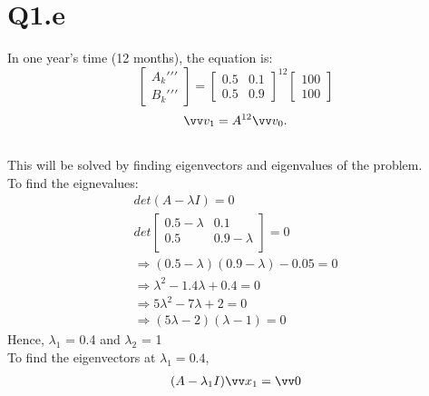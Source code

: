 \documentclass[10pt,a4paper]{article}
\numberwithin{equation}{section}
\begin{document}
		\section*{Q1.e}
		In one year's time (12 months), the equation is:
		\[\begin{bmatrix}
		A_{k}{\prime\prime\prime}\\
		B_{k}{\prime\prime\prime} 
		\end{bmatrix}
		=\begin{bmatrix}
		0.5 & 0.1 \\
		0.5 & 0.9
		\end{bmatrix}^{12}
		\begin{bmatrix}
		100 \\
		100
		\end{bmatrix}
		\]
		\[\begin{aligned}
		\vv v_{1} = A^{12} \vv v_{0}.
		\end{aligned}\]
		\\
		This will be solved by finding eigenvectors and eigenvalues of the problem.\\
		
		\noindent To find the eignevalues:
		\begin{align*}
		det(A - \lambda I) = 0 \\
		det\begin{bmatrix}
		0.5 - \lambda & 0.1\\
		0.5 & 0.9 -\lambda\\		
		\end{bmatrix}=0\\
		\Rightarrow(0.5 -\lambda)(0.9 - \lambda) - 0.05 = 0\\
		\Rightarrow\lambda^2 - 1.4\lambda + 0.4 = 0\\	
		\Rightarrow 5\lambda^2 - 7\lambda + 2 = 0\\	
		\Rightarrow (5\lambda - 2)(\lambda - 1)= 0
		\end{align*}
		Hence, $\lambda_1$ = 0.4 and $\lambda_2$ = 1 \\
		
		\noindent To find the eigenvectors at $\lambda_1 = 0.4$,
		\\
		\[\begin{aligned}
		(A - \lambda_{1}I) \vv x_{1} = \vv 0
		\end{aligned}\]
		
\end{document}
